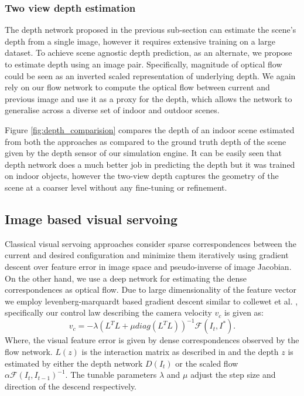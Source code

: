 \documentclass[letterpaper, 10 pt, conference]{ieeeconf}  %
\begin{document}
\subsubsection{Two view depth estimation}
The  depth network proposed in the previous sub-section can estimate the scene's depth from a single image, however it requires extensive training on a large dataset. To achieve scene agnostic depth prediction, as an alternate, we propose to estimate depth using an image pair. Specifically, magnitude of optical flow could be seen as an inverted scaled representation of underlying depth. We again rely on our flow network to compute the optical flow between current and previous image and use it as a proxy for the depth, which allows the network to generalise across a diverse set of indoor and outdoor scenes. %

\indent Figure \ref{fig:depth_comparision} compares the depth of an indoor scene estimated from both the approaches  as compared to the ground truth depth of the scene given by the depth sensor of our simulation engine. It can be easily seen that depth network does a much better job in predicting the depth but it was trained on indoor objects, however the two-view depth captures the geometry of the scene at a coarser level without any fine-tuning or refinement.   

\subsection{Image based visual servoing}
Classical visual servoing approaches consider sparse correspondences between the current and desired configuration and minimize them iteratively using gradient descent over feature error in image space and pseudo-inverse of image Jacobian. On the other hand, we use a deep network \cite{flownet2} for estimating the dense correspondences as optical flow. Due to large dimensionality of the feature vector we employ levenberg-marquardt based gradient descent similar to  collewet et al. \cite{vssetfree}, specifically our control law describing the camera velocity $v_c$ is given as: 
\begin{equation}
v_c = - \lambda (L^TL+\mu diag(L^TL))^{-1} \mathcal{F}(I_t,I^*).    
\end{equation}
Where, the visual feature error is given by dense correspondences observed by the flow network. $L(z)$ is the interaction matrix as described in \cite{vsbasic} and the depth $z$ is estimated by either the depth network $D(I_t)$ or the scaled flow $\alpha  \mathcal{F}(I_t,I_{t-1})^{-1}$. The tunable parameters $\lambda$ and $\mu$ adjust the step size and direction of the descend respectively.
\end{document}
